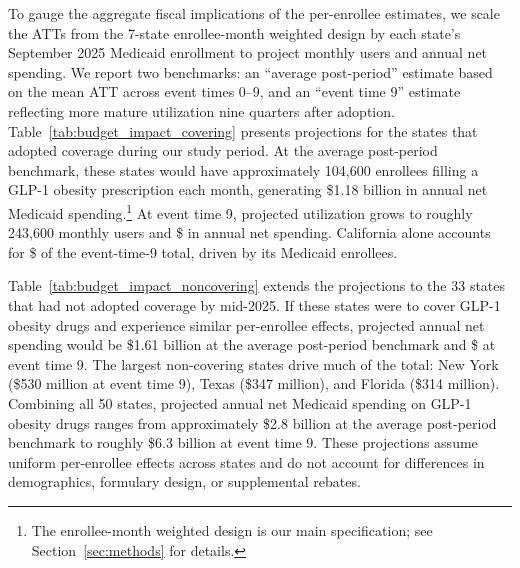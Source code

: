 To gauge the aggregate fiscal implications of the per-enrollee estimates, we scale the ATTs from the 7-state enrollee-month weighted design by each state's September 2025 Medicaid enrollment to project monthly users and annual net spending. We report two benchmarks: an ``average post-period'' estimate based on the mean ATT across event times 0--9, and an ``event time 9'' estimate reflecting more mature utilization nine quarters after adoption. Table~\ref{tab:budget_impact_covering} presents projections for the \numCoveringStates{} states that adopted coverage during our study period. At the average post-period benchmark, these states would have approximately 104,600 enrollees filling a GLP-1 obesity prescription each month, generating \$1.18 billion in annual net Medicaid spending.\footnote{The enrollee-month weighted design is our main specification; see Section~\ref{sec:methods} for details.} At event time 9, projected utilization grows to roughly 243,600 monthly users and \$\netCostCoveringEtNine{} in annual net spending. California alone accounts for \$\netCostCAetNine{} of the event-time-9 total, driven by its \enrollCA{} Medicaid enrollees.

Table~\ref{tab:budget_impact_noncovering} extends the projections to the 33 states that had not adopted coverage by mid-2025. If these states were to cover GLP-1 obesity drugs and experience similar per-enrollee effects, projected annual net spending would be \$1.61 billion at the average post-period benchmark and \$\netCostNoncoveringEtNine{} at event time 9. The largest non-covering states drive much of the total: New York (\$530 million at event time 9), Texas (\$347 million), and Florida (\$314 million). Combining all 50 states, projected annual net Medicaid spending on GLP-1 obesity drugs ranges from approximately \$2.8 billion at the average post-period benchmark to roughly \$6.3 billion at event time 9. These projections assume uniform per-enrollee effects across states and do not account for differences in demographics, formulary design, or supplemental rebates.

